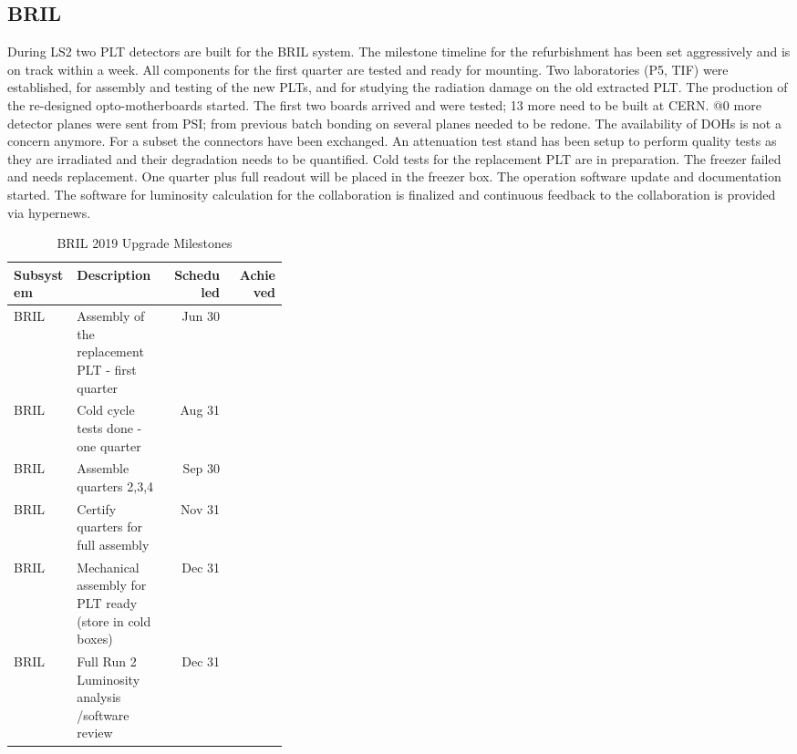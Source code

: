\documentclass[12pt]{article}
\begin{document}
\subsection{BRIL }
During LS2 two PLT detectors are built for the BRIL system. The milestone timeline for the refurbishment has been set aggressively and is on track within a week. All components for the first quarter are tested and ready for mounting. Two laboratories (P5, TIF) were established, for assembly and testing of the new PLTs, and for studying the radiation damage on the old extracted PLT. The production of the re-designed opto-motherboards started. The first two boards arrived and were tested; 13 more need to be built at CERN. @0 more detector planes were sent from PSI; from previous batch bonding on several planes needed to be redone. The availability of DOHs is not a concern anymore. For a subset the connectors have been exchanged. An attenuation test stand has been setup to perform quality tests as they are irradiated and their degradation needs to be quantified. Cold tests for the replacement PLT are in preparation. The freezer failed and needs replacement. One quarter plus full readout will be placed in the freezer box. 
The operation software update and documentation started. The software for luminosity calculation for the collaboration is finalized and continuous feedback to the collaboration is provided via hypernews.


\begin{table}[htp]
\caption{BRIL 2019 Upgrade Milestones}
\begin{center}
\begin{tabular}{|l|p{0.35\linewidth}|r|r|}
\hline
Subsystem&Description&Scheduled&Achieved\\
\hline
BRIL & Assembly of the replacement PLT - first quarter & Jun 30 &  \\
\hline
BRIL & Cold cycle tests done - one quarter & Aug 31 &  \\
\hline
BRIL & Assemble quarters 2,3,4 & Sep 30 &  \\
\hline
BRIL & Certify quarters for full assembly & Nov 31 &  \\
\hline
BRIL & Mechanical assembly for PLT ready (store in cold boxes) & Dec 31  & \\ 
\hline
BRIL & Full Run 2 Luminosity analysis /software review  & Dec 31  &  \\
\hline
\end{tabular}
\end{center}
\label{BRILMIlestones}
\end{table}%
\end{document}
